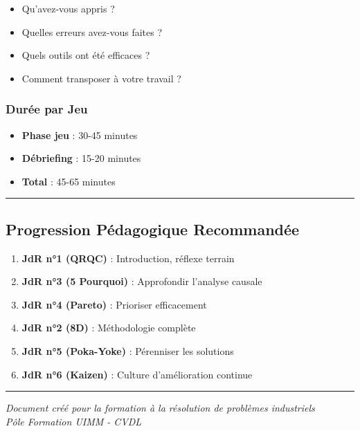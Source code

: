 \documentclass[
]{article}
\providecommand{\tightlist}{%
  \setlength{\itemsep}{0pt}\setlength{\parskip}{0pt}}
\begin{document}
\begin{itemize}
\tightlist
\item
  Qu'avez-vous appris ?
\item
  Quelles erreurs avez-vous faites ?
\item
  Quels outils ont été efficaces ?
\item
  Comment transposer à votre travail ?
\end{itemize}

\subsubsection{Durée par Jeu}\label{duruxe9e-par-jeu}

\begin{itemize}
\tightlist
\item
  \textbf{Phase jeu} : 30-45 minutes
\item
  \textbf{Débriefing} : 15-20 minutes
\item
  \textbf{Total} : 45-65 minutes
\end{itemize}

\begin{center}\rule{0.5\linewidth}{0.5pt}\end{center}

\subsection{Progression Pédagogique
Recommandée}\label{progression-puxe9dagogique-recommanduxe9e}

\begin{enumerate}
\def\labelenumi{\arabic{enumi}.}
\tightlist
\item
  \textbf{JdR n°1 (QRQC)} : Introduction, réflexe terrain
\item
  \textbf{JdR n°3 (5 Pourquoi)} : Approfondir l'analyse causale
\item
  \textbf{JdR n°4 (Pareto)} : Prioriser efficacement
\item
  \textbf{JdR n°2 (8D)} : Méthodologie complète
\item
  \textbf{JdR n°5 (Poka-Yoke)} : Pérenniser les solutions
\item
  \textbf{JdR n°6 (Kaizen)} : Culture d'amélioration continue
\end{enumerate}

\begin{center}\rule{0.5\linewidth}{0.5pt}\end{center}

\emph{Document créé pour la formation à la résolution de problèmes
industriels}\\
\emph{Pôle Formation UIMM - CVDL}
\end{document}
